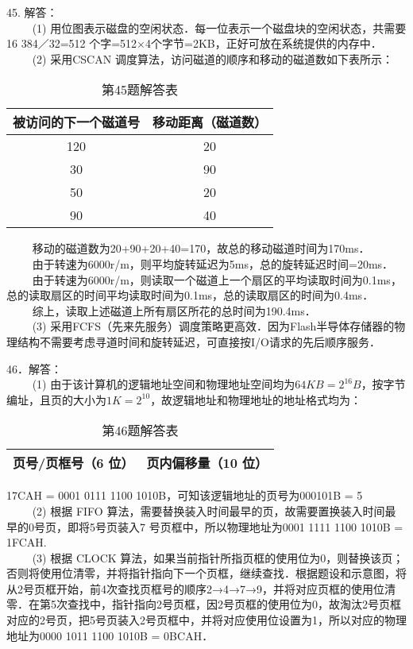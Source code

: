 45. 解答：\\
$\qquad$ (1) 用位图表示磁盘的空闲状态．每一位表示一个磁盘块的空闲状态，共需要16 384／32=512 个字=512×4个字节=2KB，正好可放在系统提供的内存中．\\
$\qquad$ (2) 采用CSCAN 调度算法，访问磁道的顺序和移动的磁道数如下表所示：\\
\begin{table}[ht]
\centering
\caption{第45题解答表}\label{CSN10_tab6}
\begin{tabular}{|c|c|}
\hline
被访问的下一个磁道号 & 移动距离（磁道数） \\
\hline
120 & 20 \\
\hline
30 & 90 \\
\hline
50 & 20 \\
\hline
90 & 40 \\
\hline
\end{tabular}
\end{table}
$\qquad$ 移动的磁道数为20+90+20+40=170，故总的移动磁道时间为170ms．  \\
$\qquad$ 由于转速为6000r/m，则平均旋转延迟为5ms，总的旋转延迟时间=20ms． \\
$\qquad$ 由于转速为6000r/m，则读取一个磁道上一个扇区的平均读取时间为0.1ms，总的读取扇区的时间平均读取时间为0.1ms，总的读取扇区的时间为0.4ms． \\
$\qquad$ 综上，读取上述磁道上所有扇区所花的总时间为190.4ms． \\
$\qquad$ (3) 采用FCFS（先来先服务）调度策略更高效．因为Flash半导体存储器的物理结构不需要考虑寻道时间和旋转延迟，可直接按I/O请求的先后顺序服务．

46．解答： \\
$\qquad$ (1) 由于该计算机的逻辑地址空间和物理地址空间均为$64KB = 2^{16}B$，按字节编址，且页的大小为$1K = 2^{10}$，故逻辑地址和物理地址的地址格式均为： \\
\begin{table}[ht]
\centering
\caption{第46题解答表}\label{CSN10_tab7}
\begin{tabular}{|c|c|}
\hline
页号/页框号（6 位） & 页内偏移量（10 位） \\
\hline
\end{tabular}
\end{table}
17CAH = 0001 0111 1100 1010B，可知该逻辑地址的页号为000101B = 5 \\
$\qquad$ (2) 根据 FIFO 算法，需要替换装入时间最早的页，故需要置换装入时间最早的0号页，即将5号页装入7 号页框中，所以物理地址为0001 1111 1100 1010B = 1FCAH. \\
$\qquad$ (3) 根据 CLOCK 算法，如果当前指针所指页框的使用位为0，则替换该页；否则将使用位清零，并将指针指向下一个页框，继续查找．根据题设和示意图，将从2号页框开始，前4次查找页框号的顺序2→4→7→9，并将对应页框的使用位清零．在第5次查找中，指针指向2号页框，因2号页框的使用位为0，故淘汰2号页框对应的2号页，把5号页装入2号页框中，并将对应使用位设置为1，所以对应的物理地址为0000 1011 1100 1010B = 0BCAH．

